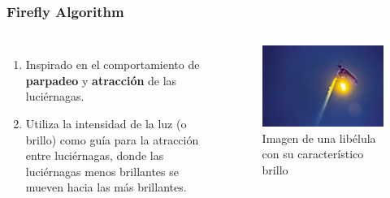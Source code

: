 \begin{frame}
  \frametitle{Firefly Algorithm}
  \begin{columns}
    \begin{enumerate}
      \item Inspirado en el comportamiento de \textbf{parpadeo} y \textbf{atracción} de las luciérnagas.
      \item Utiliza la intensidad de la luz (o brillo) como guía para la atracción entre luciérnagas, donde las luciérnagas menos brillantes se mueven hacia las más brillantes.
    \end{enumerate}
    \begin{figure}
      \begin{center}
        \includegraphics[width=\textwidth]{imagenes/chapter3/firefly.jpg}
      \end{center}
      \caption{Imagen de una libélula con su característico brillo}
    \end{figure}
  \end{columns}
\end{frame}


